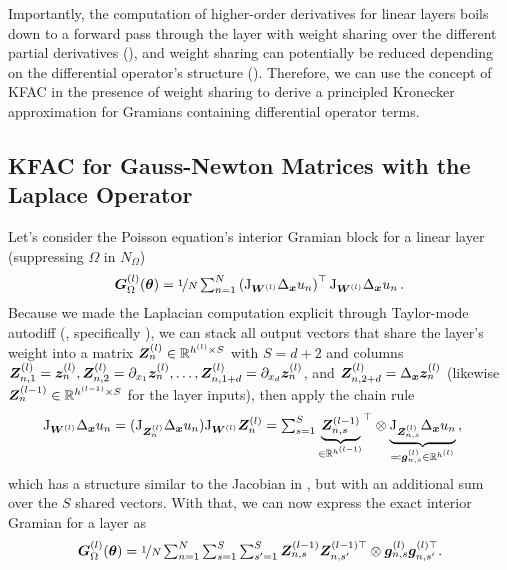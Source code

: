 Importantly, the computation of higher-order derivatives for linear layers boils down to a forward pass through the layer with weight sharing over the different partial derivatives (), and weight sharing can potentially be reduced depending on the differential operator's structure ().
Therefore, we can use the concept of KFAC in the presence of weight sharing to derive a principled Kronecker approximation for Gramians containing differential operator terms.

\subsection{KFAC for Gauss-Newton Matrices with the Laplace Operator}\label{sec:KFAC-Laplace}
Let's consider the Poisson equation's interior Gramian block for a linear layer (suppressing $\Omega$ in $N_{\Omega}$)
\begin{align*}
  {\bm{G}}^{(l)}_\Omega({\bm{\theta}})
  =
  \nicefrac{1}{N}
  \textstyle
  \sum_{n=1}^{N}
  \left(
  \mathrm{J}_{{\bm{W}}^{(l)}} \Delta_{\bm{x}} u_n  \right)^\top
  \mathrm{J}_{{\bm{W}}^{(l)}} \Delta_{\bm{x}} u_n\,.
\end{align*}
Because we made the Laplacian computation explicit through Taylor-mode autodiff (, specifically ), we can stack all output vectors that share the layer's weight into a matrix
${\bm{Z}}_n^{(l)} \in {\mathbb{R}}^{h^{(l)} \times S}$ with $S = d+2$ and columns ${\bm{Z}}_{n, 1}^{(l)} = {\bm{z}}_n^{(l)}, {\bm{Z}}_{n, 2}^{(l)} = \partial_{x_1}{\bm{z}}_n^{(l)}, \dots, {\bm{Z}}_{n, 1+d}^{(l)} = \partial_{x_d}{\bm{z}}_n^{(l)}$, and ${\bm{Z}}_{n, 2+d}^{(l)} = \Delta_{\bm{x}}{\bm{z}}_n^{(l)}$ (likewise ${\bm{Z}}_n^{(l-1)} \in {\mathbb{R}}^{h^{(l-1)} \times S}$ for the layer inputs), then apply the chain rule
\begin{align*}
  \mathrm{J}_{{\bm{W}}^{(l)}} \Delta_{\bm{x}} u_n
  &=
    (\mathrm{J}_{{\bm{Z}}_n^{(l)}}\Delta_{\bm{x}} u_n) \mathrm{J}_{{\bm{W}}^{(l)}} {\bm{Z}}_n^{(l)}
    =
    \textstyle
    \sum_{s=1}^S
    {
    \underbrace{{\bm{Z}}^{(l-1)}_{n,s}}_{\in {\mathbb{R}}^{h^{(l-1)}}}
    }^{\top}
    \otimes
    \underbrace{\mathrm{J}_{{\bm{Z}}^{(l)}_{n,s}} \Delta_{{\bm{x}}}u_n}_{\eqqcolon {\bm{g}}_{n,s}^{(l)} \in {\mathbb{R}}^{h^{(l)}}}\,,
\end{align*}
which has a structure similar to the Jacobian in , but with an additional sum over the $S$ shared vectors. With that, we can now express the exact interior Gramian for a layer as
\begin{equation}\label{eq:laplace_gramian_block_exact}
  {\bm{G}}^{(l)}_\Omega({\bm{\theta}})
  =
  \nicefrac{1}{N}
  \textstyle
  \sum_{n=1}^N
  \sum_{s=1}^S
  \sum_{s'=1}^S
  {\bm{Z}}^{(l-1)}_{n,s} {\bm{Z}}^{(l-1)\top}_{n,s'} \otimes {\bm{g}}_{n,s}^{(l)} {\bm{g}}_{n,s'}^{(l)\top}.
\end{equation}

